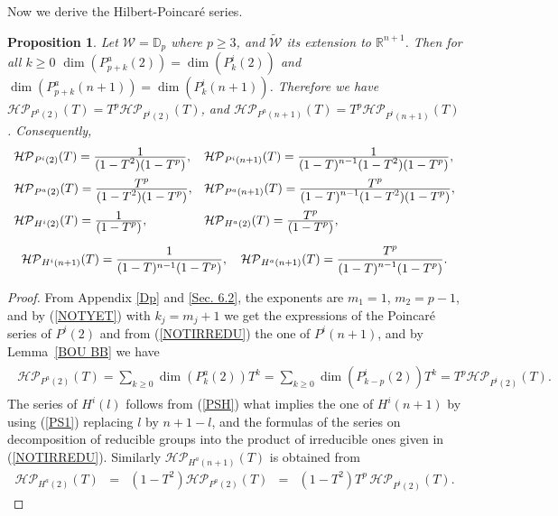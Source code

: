 \documentclass[11pt,a4paper,times]{amsart}
\theoremstyle{plain}
\newtheorem{proposition}{Proposition}[section]
\theoremstyle{definition}
\numberwithin{equation}{section}
\newcommand{\ds}{\displaystyle}
\newcommand{\dsum}{\ds\sum}
\newcommand{\eqskip}{ \vspace*{2mm}\\ }
\newcommand{\D}{\mathbb{D}}
\newcommand{\fr}[2]{\frac{\ds #1}{\ds #2}}
\newcommand{\txtg}{\textcolor{green}}
\begin{document}
{Now {we  derive} the Hilbert-Poincar\'{e} series.
\begin{proposition}
\label{Inv-Anti}
Let $\mathcal{W}=\D_p$ where $p\geq 3$, and
$\tilde{\mathcal{W}}$ its extension to $\mathbb{R}^{n+1}$.
Then for all $k\geq 0$
$\dim(P^a_{p+k}(2))=\dim(P^i_k(2))$ and $\dim(P^a_{p+k}(n+1))=\dim(P^i_k(n+1))$.
Therefore  we have  
$\mathcal{HP}_{P^a(2)}(T)=T^p\mathcal{HP}_{P^i(2)}(T)$, and $  \mathcal{HP}_{P^a(n+1)}(T)=T^p\mathcal{HP}_{P^i(n+1)}(T)$. 
 Consequently,
\begin{gather}
\begin{array}{ll}
\mathcal{HP}_{P^i(2)}(T) =\fr{1}{(1-T^2)(1-T^p)},&
\mathcal{HP}_{P^i(n+1)}(T) =\fr{1}{(1-T)^{{n-1}}(1-T^2)(1-T^p)},\eqskip
\mathcal{HP}_{P^a(2)}(T) =\fr{T^p}{(1-T^2)(1-T^p)},&
\mathcal{HP}_{P^a(n+1)}(T) =\fr{T^p}{(1-T)^{{n-1}}(1-T^2)(1-T^p)},\eqskip
 \mathcal{HP}_{H^i(2)}(T) = \fr{1}{(1-T^p)},&
\mathcal{HP}_{H^a(2)}(T)= \fr{T^p}{(1-T^p)},
\end{array}\nonumber \eqskip
\mathcal{HP}_{H^i(n+1)}(T) = \frac{1}{(1-T)^{n-1}(1-T^p)}, \quad
 \mathcal{HP}_{H^a(n+1)}(T)
=\fr{T^p}{(1-T)^{n-1}(1-T^p)}. \label{Fi}%
\end{gather}
\end{proposition}
\begin{proof}
From  Appendix \ref{Dp} and \ref{Sec. 6.2}, the exponents are $m_1=1$, $m_2=p-1$, and by
(\ref{NOTYET}) with $k_j=m_j+1$  we get the expressions of the Poincar\'{e} series of $P^i(2)$ and from (\ref{NOTIRREDU}) the one of $P^i(n+1)$, and by Lemma~\ref{BOU BB} we have 
\begin{eqnarray*}
\begin{array}{l}
\mathcal{HP}_{P^a(2)}(T)=\dsum_{k\geq 0}\dim(P^a_k(2))T^k=\sum_{k\geq 0}\dim(P^i_{k-p}(2))T^k=T^p\mathcal{HP}_{P^i(2)}(T).
\end{array}
\end{eqnarray*}
The series of $H^i(l)$ follows from (\ref{PSH}) what implies  the one of  $H^i(n+1)$  by using (\ref{PS1}) replacing $l$ by $n+1-l$,  and the formulas of the series on decomposition of {reducible} groups into the product of irreducible ones given in (\ref{NOTIRREDU}). Similarly
$\mathcal{HP}_{H^a(n+1)}(T)$ is obtained from
\[
\begin{array}{lllll}
\mathcal{HP}_{H^a(2)}(T)&=&(1-T^2)\mathcal{HP}_{P^a(2)}(T)&=&(1-T^2)T^p\, \mathcal{HP}_{P^i(2)}(T).
\end{array}
\]
\end{proof}

}
\end{document}
